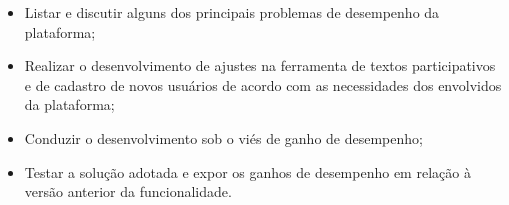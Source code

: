 \begin{itemize}
  \item Listar e discutir alguns dos principais problemas de desempenho da plataforma;
  \item Realizar o desenvolvimento de ajustes na ferramenta de textos participativos e de cadastro de novos usuários de acordo com as necessidades dos envolvidos da plataforma;
  \item Conduzir o desenvolvimento sob o viés de ganho de desempenho;
  \item Testar a solução adotada e expor os ganhos de desempenho em relação à versão anterior da funcionalidade.
\end{itemize}